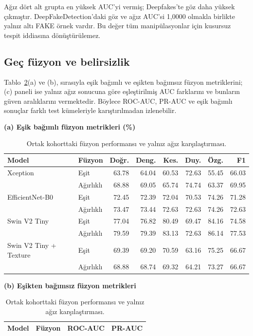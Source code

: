 \documentclass[a4paper]{elektr}
\begin{document}
Ağız dört alt grupta en yüksek AUC'yi vermiş; Deepfakes'te göz daha yüksek çıkmıştır. DeepFakeDetection'daki göz ve ağız AUC'si 1,0000 olmakla birlikte yalnız altı FAKE örnek vardır. Bu değer tüm manipülasyonlar için kusursuz tespit iddiasına dönüştürülemez.

\subsection{Geç füzyon ve belirsizlik}
Tablo~\ref{tab:fusion}(a) ve (b), sırasıyla eşik bağımlı ve eşikten bağımsız füzyon metriklerini; (c) paneli ise yalnız ağız sonucuna göre eşleştirilmiş AUC farklarını ve bunların güven aralıklarını vermektedir. Böylece ROC-AUC, PR-AUC ve eşik bağımlı sonuçlar farklı test kümeleriyle karıştırılmadan izlenebilir.
\begin{table}[!htbp]\centering\begin{minipage}{15.8cm}
\caption{Ortak kohorttaki füzyon performansı ve yalnız ağız karşılaştırması.}\label{tab:fusion}
\centering\small
\textbf{(a) Eşik bağımlı füzyon metrikleri (\%)}\par\smallskip
\begin{tabular*}{\linewidth}{@{\extracolsep{\fill}}llrrrrrr@{}}\toprule
Model & Füzyon & Doğr. & Deng. & Kes. & Duy. & Özg. & F1 \\\midrule
Xception & Eşit & 63.78 & 64.04 & 60.53 & 72.63 & 55.45 & 66.03 \\
 & Ağırlıklı & 68.88 & 69.05 & 65.74 & 74.74 & 63.37 & 69.95 \\
EfficientNet-B0 & Eşit & 72.45 & 72.39 & 72.04 & 70.53 & 74.26 & 71.28 \\
 & Ağırlıklı & 73.47 & 73.44 & 72.63 & 72.63 & 74.26 & 72.63 \\
Swin V2 Tiny & Eşit & 77.04 & 76.82 & 80.49 & 69.47 & 84.16 & 74.58 \\
 & Ağırlıklı & 79.59 & 79.39 & 83.13 & 72.63 & 86.14 & 77.53 \\
Swin V2 Tiny + Texture & Eşit & 69.39 & 69.20 & 70.59 & 63.16 & 75.25 & 66.67 \\
 & Ağırlıklı & 68.88 & 68.74 & 69.32 & 64.21 & 73.27 & 66.67 \\
\bottomrule\end{tabular*}
\par\medskip
\textbf{(b) Eşikten bağımsız füzyon metrikleri}\par\smallskip
\begin{tabular*}{\linewidth}{@{\extracolsep{\fill}}llrr@{}}\toprule
Model & Füzyon & ROC-AUC & PR-AUC \\\midrule

\end{tabular*}
\end{minipage}
\end{table}
\end{document}
